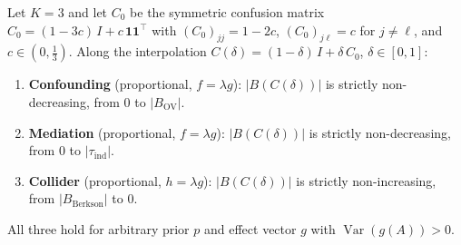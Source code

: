 %

\begin{theorem}[Monotonicity for $K{=}3$ symmetric confusion matrices]
\label{thm:k3_symmetric}
Let $K{=}3$ and let $C_0$ be the symmetric confusion matrix
$C_0 = (1{-}3c)\,I + c\,\mathbf{1}\mathbf{1}^\top$ with
$(C_0)_{jj}=1{-}2c$, $(C_0)_{j\ell}=c$ for $j\neq\ell$, and $c\in(0,\tfrac{1}{3})$.
Along the interpolation $C(\delta)=(1{-}\delta)\,I+\delta\,C_0$, $\delta\in[0,1]$:
\begin{enumerate}
  \item[\textup{(a)}] \textbf{Confounding} (proportional, $f{=}\lambda g$):
    $|B(C(\delta))|$ is strictly non-decreasing, from $0$ to $|B_{\mathrm{OV}}|$.
  \item[\textup{(b)}] \textbf{Mediation} (proportional, $f{=}\lambda g$):
    $|B(C(\delta))|$ is strictly non-decreasing, from $0$ to $|\tau_{\mathrm{ind}}|$.
  \item[\textup{(c)}] \textbf{Collider} (proportional, $h{=}\lambda g$):
    $|B(C(\delta))|$ is strictly non-increasing, from $|B_{\mathrm{Berkson}}|$ to $0$.
\end{enumerate}
All three hold for arbitrary prior $p$ and effect vector $g$ with $\operatorname{Var}(g(A)){>}0$.
\end{theorem}

